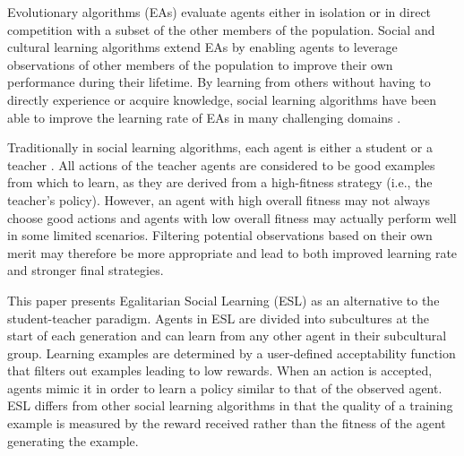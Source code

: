 \documentclass{sig-alternate}
\begin{document}
Evolutionary algorithms (EAs) \cite{fogel1966artificial} evaluate agents either in isolation or in direct competition with a subset of the other members of the population. Social and cultural learning algorithms \cite{reynolds1994introduction} extend EAs by enabling agents to leverage observations of other members of the population to improve their own performance during their lifetime. By learning from others without having to directly experience or acquire knowledge, social learning algorithms have been able to improve the learning rate of EAs in many challenging domains \cite{denaro1996cultural, haasdijk2008social, vogt2010modeling, acerbi2007social, de2011incremental, watkins1992q}.

Traditionally in social learning algorithms, each agent is either a student or a teacher \cite{parisi1997cultural, acerbi2006cultural}. All actions of the teacher agents are considered to be good examples from which to learn, as they are derived from a high-fitness strategy (i.e., the teacher's policy). However, an agent with high overall fitness may not always choose good actions and agents with low overall fitness may actually perform well in some limited scenarios. Filtering potential observations based on their own merit may therefore be more appropriate and lead to both improved learning rate and stronger final strategies.

This paper presents Egalitarian Social Learning (ESL) as an alternative to the student-teacher paradigm. Agents in ESL are divided into subcultures at the start of each generation and can learn from any other agent in their subcultural group. Learning examples are determined by a user-defined acceptability function that filters out examples leading to low rewards. When an action is accepted, agents mimic it in order to learn a policy similar to that of the observed agent. ESL differs from other social learning algorithms in that the quality of a training example is measured by the reward received rather than the fitness of the agent generating the example.

\end{document}
